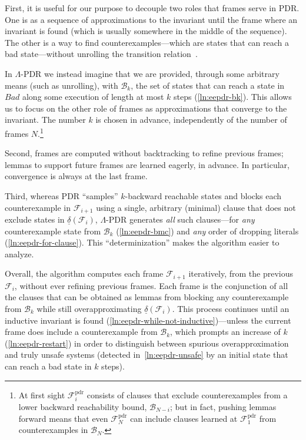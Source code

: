 \documentclass[acmsmall,screen]{acmart}
\newcommand{\Bad}{\textit{Bad}}
\newcommand{\tr}{\delta}
\newcommand{\Frame}{\mathcal{F}}
\newcommand{\Framepdr}{\mathcal{F}^{\text{pdr}}}
\newcommand{\reflextr}[1]{\underline{#1}}
\newcommand{\postimage}[2]{{\reflextr{#1}}({#2})}
\newcommand{\bkwrch}[1]{\mathcal{B}_{#1}}
\begin{document}
First, it is useful for our purpose to decouple two roles that frames serve in PDR. One is as a sequence of approximations to the invariant until the frame where an invariant is found (which is usually somewhere in the middle of the sequence). The other is a way to find counterexamples---which are states that can reach a bad state---without unrolling the transition relation~\cite{ic3}.
\begin{changebar}
In $\Lambda$-PDR we instead imagine that we are provided, through some arbitrary means (such as unrolling), with $\bkwrch{k}$, the set of states that can reach a state in $\Bad$ along some execution of length at most $k$ steps (\cref{ln:eepdr-bk}).
This allows us to focus on the other role of frames as approximations that converge to the invariant.
%
%
The number $k$ is chosen in advance, independently of the number of frames $N$.\footnote{
	At first sight $\Framepdr_i$ consists of clauses that exclude counterexamples from a lower backward reachability bound, $\bkwrch{N-i}$; but in fact, pushing lemmas forward means that even $\Framepdr_N$ can include  clauses learned at $\Framepdr_1$ from counterexamples in $\bkwrch{N}$.
}
%
%
%
%
%
\end{changebar}

Second, frames are computed without backtracking to refine previous frames; lemmas to support future frames are learned eagerly, in advance.
In particular, convergence is always at the last frame.

Third, whereas PDR ``samples'' $k$-backward reachable states and blocks each counterexample in $\Frame_{i+1}$ using a single, arbitrary (minimal) clause that does not exclude states in $\postimage{\tr}{\Frame_i}$,  $\Lambda$-PDR generates \emph{all} such clauses---for \emph{any} counterexample state from $\bkwrch{k}$ (\cref{ln:eepdr-bmc}) and \emph{any} order of dropping literals (\cref{ln:eepdr-for-clause}). This ``determinization'' makes the algorithm easier to analyze.

\begin{changebar}
Overall, the algorithm computes each frame $\Frame_{i+1}$ iteratively, from the previous $\Frame_i$, without ever refining previous frames. Each frame is the conjunction of all the clauses that can be obtained as lemmas from blocking any counterexample from $\bkwrch{k}$ while still overapproximating $\postimage{\tr}{\Frame_i}$. This process continues until an inductive invariant is found (\cref{ln:eepdr-while-not-inductive})---unless the current frame does include a counterexample from $\bkwrch{k}$, which prompts an increase of $k$ (\cref{ln:eepdr-restart}) in order to distinguish between spurious overapproximation and truly unsafe systems (detected in~\cref{ln:eepdr-unsafe} by an initial state that can reach a bad state in $k$ steps).
\end{changebar}
\end{document}
